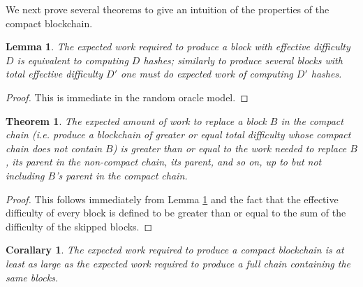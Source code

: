 \documentclass[letterpaper]{article}
\newtheorem{lmma}{Lemma}
\newtheorem{corl}{Corallary}
\newtheorem{thrm}{Theorem}
\begin{document}
We next prove several theorems to give an intuition of the properties
of the compact blockchain.

\begin{lmma} The expected work required to produce a block with effective
difficulty $D$ is equivalent to computing $D$ hashes; similarly to
produce several blocks with total effective difficulty $D'$ one must
do expected work of computing $D'$ hashes.\label{pow}\end{lmma}
\begin{proof}This is immediate in the random oracle model.\end{proof}

\begin{thrm} The expected amount of work to replace a block $B$ in the
compact chain (\emph{i.e.} produce a blockchain of greater or equal
total difficulty whose compact chain does not contain $B$) is greater
than or equal to the work needed to replace $B$, its parent in the
non-compact chain, its parent, and so on, up to but not including $B$'s
parent in the compact chain.\end{thrm}
\begin{proof} This follows immediately from Lemma \ref{pow} and the
fact that the effective difficulty of every block is defined to be
greater than or equal to the sum of the difficulty of the skipped
blocks.
\end{proof}

\begin{corl} The expected work required to produce a compact blockchain
is at least as large as the expected work required to produce a full
chain containing the same blocks.\end{corl}
\end{document}
